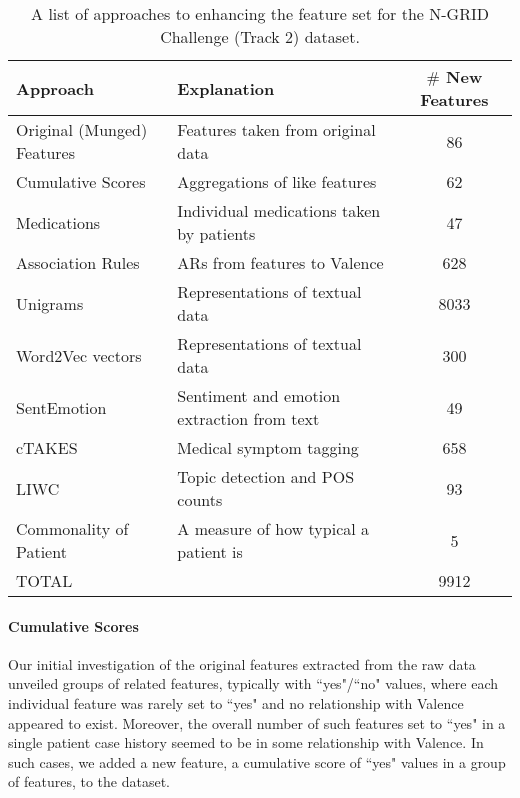 \begin{table}[t]
 \centering
 \begin{tabular}{|l|l|c|}
    \hline
    \textsf{Approach}  & \textsf{Explanation} & $\#$ \textsf{New Features}  \\
    \hline
      \textsf{Original (Munged) Features}& Features taken from original data & 86 \\
\hline
      \textsf{Cumulative Scores}& Aggregations of like features & 62 \\ 
      \textsf{Medications} & Individual medications taken by patients & 47 \\ %
           
      \textsf{Association Rules} & ARs from features to \textsf{Valence}& 628\\
     
      \textsf{Unigrams} & Representations of textual data  & 8033 \\ 
      \textsf{Word2Vec vectors}& Representations of textual data & 300 \\
      \textsf{SentEmotion} & Sentiment and emotion extraction from text & 49 \\
      \textsf{cTAKES} & Medical symptom tagging & 658 \\
      \textsf{LIWC} & Topic detection and POS counts & 93 \\ 
      \textsf{Commonality of Patient} & A measure of how typical a patient is & 5 \\
      \hline
      \textsf{TOTAL} & & 9912\\
      \hline
 \end{tabular}
 \caption{A list of approaches to enhancing the feature set for the N-GRID Challenge (Track 2) dataset.}
 \label{tab:features}
\end{table}
 
 
 \paragraph{Cumulative Scores}  Our initial investigation of the original 
 features extracted from the raw data unveiled groups of related features, typically
 with ``yes"/``no" values, where each individual feature was rarely set to ``yes" and no relationship with \textsf{Valence} appeared to exist. Moreover,
 the overall number of such features set to ``yes" in a single patient case history seemed to be in some relationship with \textsf{Valence}.  In such cases, we added a new feature, a
 \textsf{cumulative score} of ``yes" values in a group of features, to the dataset.
 
